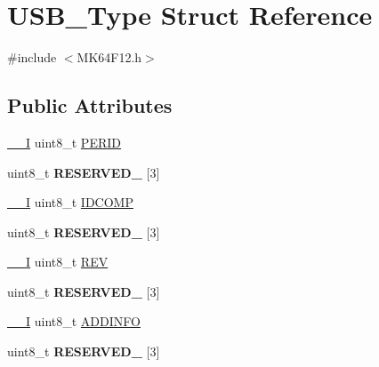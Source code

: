 \hypertarget{structUSB__Type}{}\section{U\+S\+B\+\_\+\+Type Struct Reference}
\label{structUSB__Type}


{\ttfamily \#include $<$M\+K64\+F12.\+h$>$}

\subsection*{Public Attributes}
\begin{DoxyCompactItemize}
\item 
\hyperlink{core__sc300_8h_af63697ed9952cc71e1225efe205f6cd3}{\+\_\+\+\_\+I} uint8\+\_\+t \hyperlink{structUSB__Type_a2e5e3896393e567c46fbcfe1ea92bade}{P\+E\+R\+ID}
\item 
uint8\+\_\+t {\bfseries R\+E\+S\+E\+R\+V\+E\+D\+\_} \mbox{[}3\mbox{]}\hypertarget{structUSB__Type_a90d77e118df0ff984616c07cdf996190}{}\label{structUSB__Type_a90d77e118df0ff984616c07cdf996190}

\item 
\hyperlink{core__sc300_8h_af63697ed9952cc71e1225efe205f6cd3}{\+\_\+\+\_\+I} uint8\+\_\+t \hyperlink{structUSB__Type_afff047b66a448cfa17baf6acf33fd58a}{I\+D\+C\+O\+MP}
\item 
uint8\+\_\+t {\bfseries R\+E\+S\+E\+R\+V\+E\+D\+\_} \mbox{[}3\mbox{]}\hypertarget{structUSB__Type_ad3d90bb3dbd8ca337e424d6c4a2d2fdf}{}\label{structUSB__Type_ad3d90bb3dbd8ca337e424d6c4a2d2fdf}

\item 
\hyperlink{core__sc300_8h_af63697ed9952cc71e1225efe205f6cd3}{\+\_\+\+\_\+I} uint8\+\_\+t \hyperlink{structUSB__Type_aebfcc05a57aa51e7cdeb38d058ccd5f1}{R\+EV}
\item 
uint8\+\_\+t {\bfseries R\+E\+S\+E\+R\+V\+E\+D\+\_} \mbox{[}3\mbox{]}\hypertarget{structUSB__Type_adf665f0f6b8d868813021d5d5e9889a7}{}\label{structUSB__Type_adf665f0f6b8d868813021d5d5e9889a7}

\item 
\hyperlink{core__sc300_8h_af63697ed9952cc71e1225efe205f6cd3}{\+\_\+\+\_\+I} uint8\+\_\+t \hyperlink{structUSB__Type_a7271c06f949d448fa10196e2bb10bd93}{A\+D\+D\+I\+N\+FO}
\item 
uint8\+\_\+t {\bfseries R\+E\+S\+E\+R\+V\+E\+D\+\_} \mbox{[}3\mbox{]}\hypertarget{structUSB__Type_aab93ff93baf90af0324659231a7120ec}{}\label{structUSB__Type_aab93ff93baf90af0324659231a7120ec}


\end{DoxyCompactItemize}
